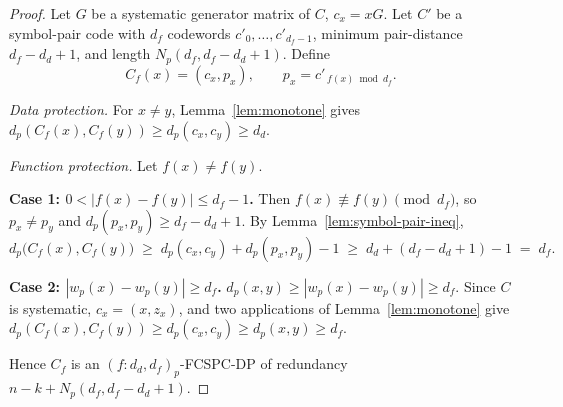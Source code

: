 \documentclass[11pt,draftclsnofoot,journal,onecolumn]{IEEEtran}
\newtheorem{definition}{Definition}
\begin{document}
    \begin{proof}
    Let $G$ be a systematic generator matrix of $C$, $c_x = xG$. Let $C'$ be a symbol-pair code with $d_f$ codewords $c'_0,\dots,c'_{d_f-1}$, minimum pair-distance $d_f - d_d + 1$, and length $N_p(d_f, d_f-d_d+1)$. Define
    \[
        C_f(x) = (c_x, p_x), \qquad p_x = c'_{\,f(x) \bmod d_f} .
    \]
    
    \emph{Data protection.} For $x \neq y$, Lemma~\ref{lem:monotone} gives $d_p(C_f(x),C_f(y)) \ge d_p(c_x,c_y) \ge d_d$.
    
    \emph{Function protection.} Let $f(x) \neq f(y)$.
    
    \textbf{Case 1: $0 < |f(x)-f(y)| \le d_f - 1$.} Then $f(x) \not\equiv f(y) \pmod{d_f}$, so $p_x \neq p_y$ and $d_p(p_x,p_y) \ge d_f - d_d + 1$. By Lemma~\ref{lem:symbol-pair-ineq},
    \[
        d_p\bigl(C_f(x),C_f(y)\bigr) \;\ge\; d_p(c_x,c_y) + d_p(p_x,p_y) - 1
        \;\ge\; d_d + (d_f - d_d + 1) - 1 \;=\; d_f .
    \]
    
    \textbf{Case 2: $|w_p(x) - w_p(y)| \ge d_f$.} 
    $d_p(x,y) \ge |w_p(x) - w_p(y)| \geq d_f$. Since $C$ is systematic, $c_x = (x, z_x)$, and two applications of
    Lemma~\ref{lem:monotone} give
    $d_p(C_f(x),C_f(y)) \ge d_p(c_x,c_y) \ge d_p(x,y) \ge d_f$.
    
    Hence $C_f$ is an $(f : d_d, d_f)_p$-FCSPC-DP of redundancy
    $n - k + N_p(d_f, d_f-d_d+1)$.
    \end{proof}

\end{document}
